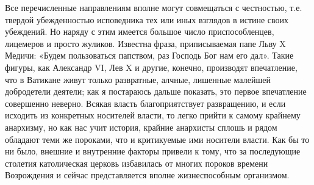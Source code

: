 Все перечисленные направлениям вполне  могут совмещаться с честностью,
т.е.  твердой  убежденностью  исповедника  тех  или  иных  взглядов  в
истине  своих  убеждений.  Но  наряду с  этим  имеется  большое  число
приспособленцев,   лицемеров  и   просто   жуликов.  Известна   фраза,
приписываемая папе  Льву X  Медичи: «Будем пользоваться  папством, раз
Господь  Бог нам  его  дал». Такие  фигуры, как  Александр  VI, Лев  X
и  другие,  конечно,  производят  впечатление, что  в  Ватикане  живут
только развратные, алчные, лишенные  малейшей добродетели деятели; как
я  постараюсь  дальше  показать,  это  первое  впечатление  совершенно
неверно. Всякая  власть благоприятствует развращению, и  если исходить
из  конкретных носителей  власти, то  легко прийти  к самому  крайнему
анархизму, но как  нас учит история, крайние анархисты  сплошь и рядом
обладают теми же пороками, что  и критикуемые ими носители власти. Как
бы то  ни было, внешние  и внутренние факторы  привели к тому,  что за
последующие столетия католическая церковь избавилась от многих пороков
времени  Возрождения  и  сейчас представляется  вполне  жизнеспособным
организмом.


